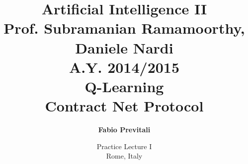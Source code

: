 \documentclass{beamer}
\title[Artificial Intelligence II - Practice Lecture I]{\Large Artificial Intelligence II\\ \small \vspace{0.05cm} Prof. Subramanian Ramamoorthy, Daniele Nardi \\ \footnotesize \vspace{0.05cm} A.Y. 2014/2015 \\ \huge Q-Learning\\ \vspace{-0.1cm} Contract Net Protocol}
\subtitle{}
\author[Fabio Previtali]{\Large\textbf{Fabio Previtali}}
\date[May 11, 2015]{Practice Lecture I\\Rome, Italy}
\begin{document}
\begin{frame}[plain]
	\titlepage
\end{frame}




\end{document}
